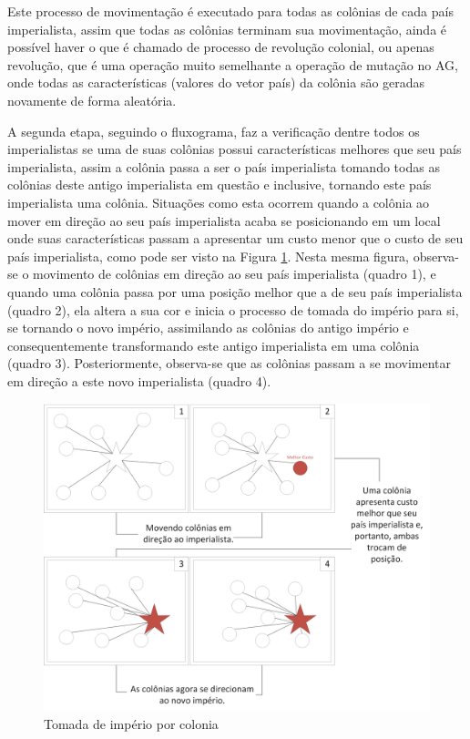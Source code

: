Este processo de movimentação é executado para todas as colônias de cada país imperialista, assim que todas as colônias terminam sua movimentação, ainda é possível haver o que é chamado de processo de revolução colonial, ou apenas revolução, que é uma operação muito semelhante a operação de mutação no AG, onde todas as características (valores do vetor país) da colônia são geradas novamente de forma aleatória.

A segunda etapa, seguindo o fluxograma, faz a verificação dentre todos os imperialistas se uma de suas colônias possui características melhores que seu país imperialista, assim a colônia passa a ser o país imperialista tomando todas as colônias deste antigo imperialista em questão e inclusive, tornando este país imperialista uma colônia. Situações como esta ocorrem quando a colônia ao mover em direção ao seu país imperialista acaba se posicionando em um local onde suas características passam a apresentar um custo menor que o custo de seu país imperialista, como pode ser visto na Figura \ref{fig:Ilustrations-ColonialRevolution}. Nesta mesma figura, observa-se o movimento de colônias em direção ao seu país imperialista (quadro 1), e quando uma colônia passa por uma posição melhor que a de seu país imperialista (quadro 2), ela altera a sua cor e inicia o processo de tomada do império para si, se tornando o novo império, assimilando as colônias do antigo império e consequentemente transformando este antigo imperialista em uma colônia (quadro 3). Posteriormente, observa-se que as colônias passam a se movimentar em direção a este novo imperialista (quadro 4).

\begin{figure}[h]
	\centering	
	\includegraphics[scale=0.5]{Figuras/Ilustrations-ColonialRevolution.png}
	\caption{Tomada de império por colonia}
	\label{fig:Ilustrations-ColonialRevolution}
\end{figure}

